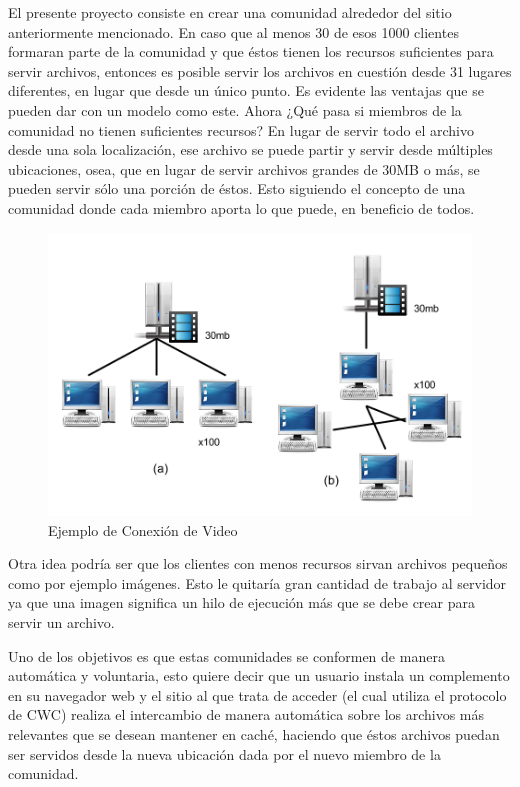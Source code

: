 El presente proyecto consiste en crear una comunidad alrededor del sitio anteriormente mencionado. En caso que al menos 30 de esos 1000 clientes formaran parte de la comunidad y que éstos tienen los recursos suficientes para servir archivos, entonces es posible servir los archivos en cuestión desde 31 lugares diferentes, en lugar que desde un único punto. Es evidente las ventajas que se pueden dar con un modelo como este. Ahora ¿Qué pasa si miembros de la comunidad no tienen suficientes recursos? En lugar de servir todo el archivo desde una sola localización, ese archivo se puede partir y servir desde múltiples ubicaciones, osea, que en lugar de servir archivos grandes de 30MB o más, se pueden servir sólo una porción de éstos. Esto siguiendo el concepto de una comunidad donde cada miembro aporta lo que puede, en beneficio de todos. 

\begin{figure}[h]
  \centering
    \includegraphics[scale=0.7]{gfx/conexion_video}
  \caption{Ejemplo de Conexión de Video}
  \label{conexionvideo}
\end{figure}

Otra idea podría ser que los clientes con menos recursos sirvan archivos pequeños como por ejemplo imágenes. Esto le quitaría gran cantidad de trabajo al servidor ya que una imagen significa un hilo de ejecución más que se debe crear para servir un archivo.

Uno de los objetivos es que estas comunidades se conformen de manera automática y voluntaria, esto quiere decir que un usuario instala un complemento en su navegador web y el sitio al que trata de acceder (el cual utiliza el protocolo de CWC) realiza el intercambio de manera automática sobre los archivos más relevantes que se desean mantener en caché, haciendo que éstos archivos puedan ser servidos desde la nueva ubicación dada por el nuevo miembro de la comunidad.

